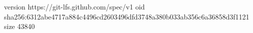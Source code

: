 version https://git-lfs.github.com/spec/v1
oid sha256:6312abe4717a884c4496cd2603496dfd3748a380b033ab356c6a36858d3f1121
size 43840

